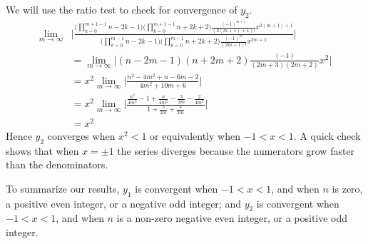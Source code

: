 \documentclass[12pt]{article}
\begin{document}
	We will use the ratio test to check for convergence of $y_2$.
	\begin{align*}
		\lim\limits_{m \to \infty} & \Bigg\vert \frac{\Bigg(\prod\limits_{k=0}^{m+1-1}n-2k-1 \Bigg) \Bigg(\prod\limits_{k=0}^{m+1-1}n+2k+2 \Bigg) \frac{(-1)^{m+1}}{(2(m+1)+1)!}x^{2(m+1)+1}}{\Bigg(\prod\limits_{k=0}^{m-1}n-2k-1 \Bigg) \Bigg(\prod\limits_{k=0}^{m-1}n+2k+2 \Bigg) \frac{(-1)^{m}}{(2m+1)!}x^{2m+1}} \Bigg\vert \\
		& = \lim\limits_{m \to \infty} \Bigg\vert (n-2m-1)(n+2m+2) \frac{(-1)}{(2m+3)(2m+2)}x^{2} \Bigg\vert \\
		& = x^2 \lim\limits_{m \to \infty} \Bigg\vert \frac{n^2 - 4m^2 + n -6m -2}{4m^2+10m+6} \Bigg\vert \\
		& = x^2 \lim\limits_{m \to \infty} \Bigg\vert \frac{\frac{n^2}{4m^2} - 1 + \frac{n}{4m^2} -\frac{3}{2m} -\frac{2}{4m^2}}{1+\frac{5}{2m}+\frac{3}{2m}} \Bigg\vert \\
		& = x^2
	\end{align*}
	Hence $y_2$ converges when $x^2<1$ or equivalently when $-1 < x < 1$. A quick check shows that when $x= \pm 1$ the series diverges because the numerators grow faster than the denominators.\bigbreak
	
	To summarize our results, $y_1$ is convergent when $-1<x<1$, and when $n$ is zero, a positive even integer, or a negative odd integer; and $y_2$ is convergent when $-1<x<1$, and when $n$ is a non-zero negative even integer, or a positive odd integer. \\
\end{document}
